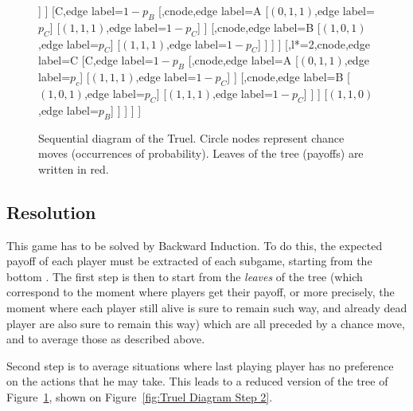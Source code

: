 \documentclass{article}
\begin{document}
\begin{landscape}
\begin{figure}[!h]
\begin{forest}
			[{},cnode,edge label=A
				[C,l*=2,edge label=$\scriptstyle p_B$
					[{},cnode,edge label=B
						[{$\scriptstyle (0,0,1)$},edge label=$\scriptstyle p_C$]
						[{$\scriptstyle (0,1,1)$},edge label=$\scriptstyle 1-p_C$]
					]
				]
				[C,edge label=$\scriptstyle 1-p_B$
					[{},cnode,edge label=A
						[{$\scriptstyle (0,1,1)$},edge label=$\scriptstyle p_C$]
						[{$\scriptstyle (1,1,1)$},edge label=$\scriptstyle 1-p_C$]
					]
					[{},cnode,edge label=B
						[{$\scriptstyle (1,0,1)$},edge label=$\scriptstyle p_C$]
						[{$\scriptstyle (1,1,1)$},edge label=$\scriptstyle 1-p_C$]
					]
				]
			]
			[{},l*=2,cnode,edge label=C
				[C,edge label=$\scriptstyle 1-p_B$
					[{},cnode,edge label=A
						[{$\scriptstyle (0,1,1)$},edge label=$\scriptstyle p_c$]
						[{$\scriptstyle (1,1,1)$},edge label=$\scriptstyle 1-p_C$]
					]
					[{},cnode,edge label=B
						[{$\scriptstyle (1,0,1)$},edge label=$\scriptstyle p_C$]
						[{$\scriptstyle (1,1,1)$},edge label=$\scriptstyle 1-p_C$]
					]
				]
				[{$\scriptstyle (1,1,0)$},edge label=$\scriptstyle p_B$]
			]
		]
	]
]
\end{forest}
\caption{Sequential diagram of the Truel. Circle nodes represent chance moves (occurrences of probability).
Leaves of the tree (payoffs) are written in red.\label{fig:Truel Diagram}}
\end{figure}
\end{landscape}

\subsection{Resolution}
This game has to be solved by Backward Induction. To do this, the expected payoff of each player must be extracted of
each subgame, starting from the bottom%
. The first step is then to start from the \textit{leaves} of the tree (which correspond to the moment where players
get their payoff, or more precisely, the moment where each player still alive is sure to remain such way, and already
dead player are also sure to remain this way) which are all preceded by a chance move, and to average those as described above.

Second step is to average situations where last playing player has no preference on the actions that he may take. This leads to
a reduced version of the tree of Figure~\ref{fig:Truel Diagram}, shown on Figure~\ref{fig:Truel Diagram Step 2}.
\end{document}
